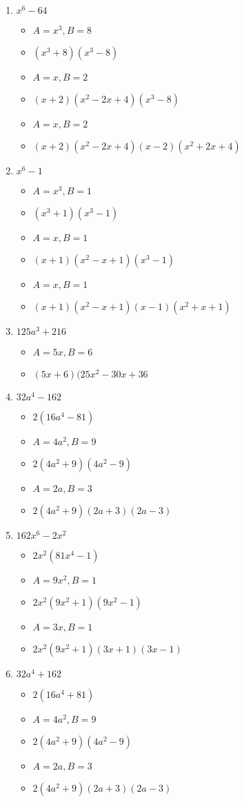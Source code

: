 \documentclass{article}
\begin{document}
\begin{enumerate}
\item $x^{6} - 64$
  \begin{itemize}
  \item $A=x^{3}, B=8$
  \item $(x^{3}+8)(x^{3}-8)$
  \item $A=x, B=2$
  \item $(x+2)(x^{2}-2x+4)(x^{3}-8)$
  \item $A=x, B=2$
  \item $(x+2)(x^{2}-2x+4)(x-2)(x^{2}+2x+4)$
  \end{itemize}
\item $x^{6} - 1$
  \begin{itemize}
  \item $A=x^{3}, B=1$
  \item $(x^{3}+1)(x^{3}-1)$
  \item $A=x, B=1$
  \item $(x+1)(x^{2}-x+1)(x^{3}-1)$
  \item $A=x, B=1$
  \item $(x+1)(x^{2}-x+1)(x-1)(x^{2}+x+1)$
  \end{itemize}
\item $125a^{3} + 216$
  \begin{itemize}
  \item $A=5x, B=6$
  \item $(5x+6)(25x^{2}-30x+36$
  \end{itemize}
\item $32a^{4} - 162$
  \begin{itemize}
  \item $2(16a^{4}-81)$
  \item $A=4a^{2}, B=9$
  \item $2(4a^{2}+9)(4a^{2}-9)$
  \item $A=2a, B=3$
  \item $2(4a^{2}+9)(2a+3)(2a-3)$
  \end{itemize}
\item $162x^{6} -2x^{2}$
  \begin{itemize}
  \item $2x^{2}(81x^{4}-1)$
  \item $A=9x^{2}, B=1$
  \item $2x^{2}(9x^{2}+1)(9x^{2}-1)$
  \item $A=3x, B=1$
  \item $2x^{2}(9x^{2}+1)(3x+1)(3x-1)$
  \end{itemize}
\item $32a^{4} + 162$
  \begin{itemize}
  \item $2(16a^{4}+81)$
  \item $A=4a^{2}, B=9$
  \item $2(4a^{2}+9)(4a^{2}-9)$
  \item $A=2a, B=3$
  \item $2(4a^{2}+9)(2a+3)(2a-3)$
  \end{itemize}
\end{enumerate}
\end{document}
